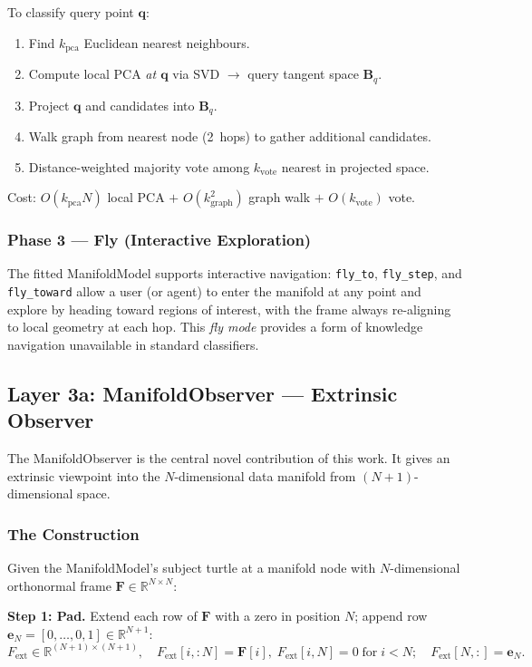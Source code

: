 \documentclass[12pt,letterpaper]{article}
\newcommand{\RR}{\mathbb{R}}
\newcommand{\bF}{\mathbf{F}}
\newcommand{\bB}{\mathbf{B}}
\newcommand{\bq}{\mathbf{q}}
\begin{document}
To classify query point $\bq$:
\begin{enumerate}[leftmargin=*]
  \item Find $k_\text{pca}$ Euclidean nearest neighbours.
  \item Compute local PCA \emph{at $\bq$} via SVD $\to$ query tangent space
    $\bB_q$.
  \item Project $\bq$ and candidates into $\bB_q$.
  \item Walk graph from nearest node (2~hops) to gather additional candidates.
  \item Distance-weighted majority vote among $k_\text{vote}$ nearest in
    projected space.
\end{enumerate}
Cost: $O(k_\text{pca} N)$ local PCA $+$ $O(k_\text{graph}^2)$ graph walk $+$
$O(k_\text{vote})$ vote.

\subsubsection{Phase 3 --- Fly (Interactive Exploration)}

The fitted ManifoldModel supports interactive navigation: \texttt{fly\_to},
\texttt{fly\_step}, and \texttt{fly\_toward} allow a user (or agent) to enter
the manifold at any point and explore by heading toward regions of interest, with
the frame always re-aligning to local geometry at each hop.  This \emph{fly
mode} provides a form of knowledge navigation unavailable in standard
classifiers.

\subsection{Layer 3a: ManifoldObserver --- Extrinsic Observer}
\label{sec:observer}

The ManifoldObserver is the central novel contribution of this work.
It gives an extrinsic viewpoint into the $N$-dimensional data manifold from
$(N+1)$-dimensional space.

\subsubsection{The Construction}

Given the ManifoldModel's subject turtle at a manifold node with $N$-dimensional
orthonormal frame $\bF \in \RR^{N \times N}$:

\textbf{Step 1: Pad.}  Extend each row of $\bF$ with a zero in position $N$;
append row $\mathbf{e}_N = [0,\ldots,0,1] \in \RR^{N+1}$:
\[
  F_\text{ext} \in \RR^{(N+1)\times(N+1)}, \quad
  F_\text{ext}[i,{:}N] = \bF[i],\;
  F_\text{ext}[i,N] = 0 \;\text{for}\; i<N; \quad
  F_\text{ext}[N,{:}] = \mathbf{e}_N.
\]
\end{document}
